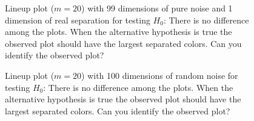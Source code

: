 \documentclass[12]{report}
\begin{document}
\begin{figure}[hbtp]
   \centering
       \caption{Lineup plot ($m=20$) with 99 dimensions of pure noise and 1 dimension of real separation for testing $H_0$: There is no difference among the plots. When the alternative hypothesis is true the observed plot should have the largest separated colors. Can you identify the observed plot?}
       \label{not_noise_1d}
\end{figure}
 
\begin{figure}[hbtp]
   \centering
       \caption{Lineup plot ($m=20$) with 100 dimensions of random noise for testing $H_0$: There is no difference among the plots. When the alternative hypothesis is true the observed plot should have the largest separated colors. Can you identify the observed plot?}
       \label{fig:test_category}
\end{figure}
\end{document}
